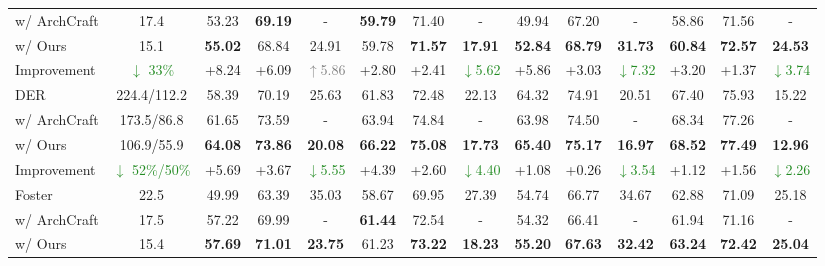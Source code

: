 \begin{table}[t]
{\begin{tabular}{@{\hspace{2mm}}lccccccccccccc@{\hspace{2mm}}}
        \color{ac_gray}
        w/ ArchCraft &17.4 &53.23 &\textbf{69.19} &- &\textbf{59.79} &71.40 &- &49.94 &67.20 &- &58.86 &71.56 &-\\
        w/ Ours &15.1 &\textbf{55.02} &68.84 &24.91 &59.78 &\textbf{71.57} &\textbf{17.91} &\textbf{52.84} &\textbf{68.79} &\textbf{31.73} &\textbf{60.84} &\textbf{72.57} &\textbf{24.53}\\
        \cmidrule(lr){1-14}
        Improvement &\textcolor{forestgreen}{$\downarrow$ 33\%} &\textcolor{forestred}{+8.24} &\textcolor{forestred}{+6.09} &\textcolor{gray}{$\uparrow$5.86} &\textcolor{forestred}{+2.80} &\textcolor{forestred}{+2.41} &\textcolor{forestgreen}{$\downarrow$5.62} &\textcolor{forestred}{+5.86} &\textcolor{forestred}{+3.03} &\textcolor{forestgreen}{$\downarrow$7.32} &\textcolor{forestred}{+3.20} &\textcolor{forestred}{+1.37} &\textcolor{forestgreen}{$\downarrow$3.74}\\
        \midrule
        DER  &224.4/112.2 &58.39 &70.19 &25.63 &61.83 &72.48 &22.13 &64.32 &74.91 &20.51 &67.40 &75.93 &15.22\\ %
        \color{ac_gray}
        w/ ArchCraft &173.5/86.8 &61.65 &73.59 &- &63.94 &74.84 &- &63.98 &74.50 &- &68.34 &77.26 &-\\
        w/ Ours &106.9/55.9 &\textbf{64.08} &\textbf{73.86} &\textbf{20.08} &\textbf{66.22} &\textbf{75.08} &\textbf{17.73} &\textbf{65.40} &\textbf{75.17} &\textbf{16.97} &\textbf{68.52} &\textbf{77.49} &\textbf{12.96}\\
        \cmidrule(lr){1-14}
        Improvement &\textcolor{forestgreen}{$\downarrow$ 52\%/50\%} &\textcolor{forestred}{+5.69} &\textcolor{forestred}{+3.67} &\textcolor{forestgreen}{$\downarrow$5.55} &\textcolor{forestred}{+4.39} &\textcolor{forestred}{+2.60} &\textcolor{forestgreen}{$\downarrow$4.40} &\textcolor{forestred}{+1.08} &\textcolor{forestred}{+0.26} &\textcolor{forestgreen}{$\downarrow$3.54} &\textcolor{forestred}{+1.12} &\textcolor{forestred}{+1.56} &\textcolor{forestgreen}{$\downarrow$2.26}\\
        \midrule
        Foster &22.5 &49.99 &63.39 &35.03 &58.67 &69.95 &27.39  &54.74  &66.77 &34.67  &62.88  &71.09 &25.18\\ %
        \color{ac_gray}
        w/ ArchCraft &17.5 &57.22 &69.99 &- &\textbf{61.44} &72.54 &- &54.32 &66.41 &- &61.94 &71.16 &-\\
        w/ Ours &15.4 &\textbf{57.69} &\textbf{71.01} &\textbf{23.75} &61.23 &\textbf{73.22} &\textbf{18.23} &\textbf{55.20} &\textbf{67.63} &\textbf{32.42} &\textbf{63.24} &\textbf{72.42} &\textbf{25.04} \\

\end{tabular}}
\end{table}
